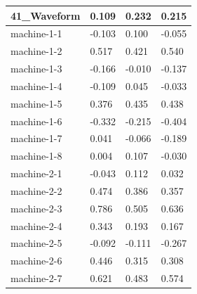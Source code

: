 \begin{table}[]
{\begin{tabular}{|l|l|l|l|}
			41\_Waveform    & 0.109                        & 0.232                        & 0.215                         \\ \hline
			machine-1-1     & -0.103                       & 0.100                        & -0.055                        \\ \hline
			machine-1-2     & 0.517                        & 0.421                        & 0.540                         \\ \hline
			machine-1-3     & -0.166                       & -0.010                       & -0.137                        \\ \hline
			machine-1-4     & -0.109                       & 0.045                        & -0.033                        \\ \hline
			machine-1-5     & 0.376                        & 0.435                        & 0.438                         \\ \hline
			machine-1-6     & -0.332                       & -0.215                       & -0.404                        \\ \hline
			machine-1-7     & 0.041                        & -0.066                       & -0.189                        \\ \hline
			machine-1-8     & 0.004                        & 0.107                        & -0.030                        \\ \hline
			machine-2-1     & -0.043                       & 0.112                        & 0.032                         \\ \hline
			machine-2-2     & 0.474                        & 0.386                        & 0.357                         \\ \hline
			machine-2-3     & 0.786                        & 0.505                        & 0.636                         \\ \hline
			machine-2-4     & 0.343                        & 0.193                        & 0.167                         \\ \hline
			machine-2-5     & -0.092                       & -0.111                       & -0.267                        \\ \hline
			machine-2-6     & 0.446                        & 0.315                        & 0.308                         \\ \hline
			machine-2-7     & 0.621                        & 0.483                        & 0.574                         \\ \hline

\end{tabular}}
\end{table}
